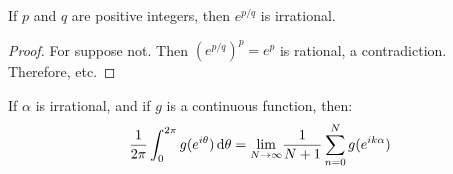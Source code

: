 \documentclass[crop=false,class=book,oneside]{standalone}
\begin{document}
            \begin{theorem}
                If $p$ and $q$ are positive integers, then
                $e^{p/q}$ is irrational.
            \end{theorem}
            \begin{proof}
                For suppose not. Then
                $(e^{p/q})^{p}=e^{p}$ is rational, a contradiction.
                Therefore, etc.
            \end{proof}
            \begin{theorem}
                If $\alpha$ is irrational, and if $g$ is a continuous
                function, then:
                \begin{equation*}
                    \frac{1}{2\pi}\int_{0}^{2\pi}g(e^{i\theta})\mathop{}\!\mathrm{d}{\theta}
                    =\underset{N\rightarrow\infty}{\lim}
                    \frac{1}{N+1}\sum_{n=0}^{N}g(e^{ik\alpha})
                \end{equation*}
            \end{theorem}
\end{document}
